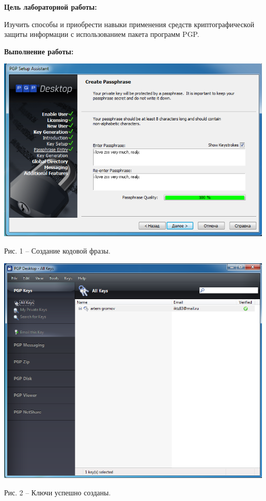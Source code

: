 \documentclass[a4paper,14pt]{extarticle}
\begin{document}
    \textbf{Цель лабораторной работы:} \par
    Изучить способы и приобрести навыки применения средств криптографической 
    защиты информации с использованием пакета программ PGP.

    \textbf{Выполнение работы:}
    \begin{center}
        \includegraphics[scale=0.6]{pics/1.png}

        Рис. 1 – Создание кодовой фразы.
    \end{center}
    \begin{center}
        \includegraphics[scale=0.45]{pics/2.png}
        
        Рис. 2 – Ключи успешно созданы.
    \end{center}
\end{document}
